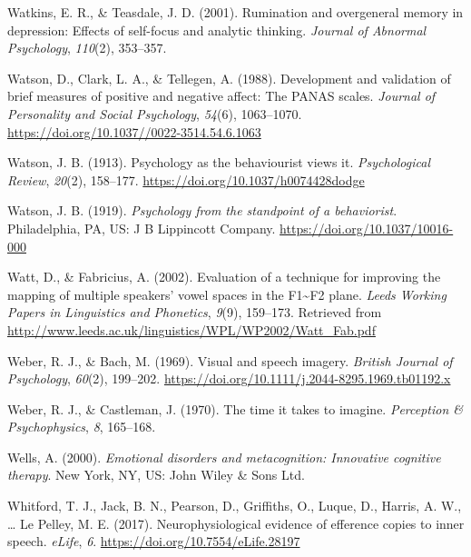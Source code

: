 \documentclass[a4paper,12pt,twoside,onecolumn,openright,final,oldfontcommands]{memoir}
\begin{document}
\leavevmode\hypertarget{ref-watkins_rumination_2001}{}%
Watkins, E. R., \& Teasdale, J. D. (2001). Rumination and overgeneral memory in depression: Effects of self-focus and analytic thinking. \emph{Journal of Abnormal Psychology}, \emph{110}(2), 353--357.

\leavevmode\hypertarget{ref-watson_development_1988}{}%
Watson, D., Clark, L. A., \& Tellegen, A. (1988). Development and validation of brief measures of positive and negative affect: The PANAS scales. \emph{Journal of Personality and Social Psychology}, \emph{54}(6), 1063--1070. \url{https://doi.org/10.1037//0022-3514.54.6.1063}

\leavevmode\hypertarget{ref-watson_psychology_1913}{}%
Watson, J. B. (1913). Psychology as the behaviourist views it. \emph{Psychological Review}, \emph{20}(2), 158--177. \url{https://doi.org/10.1037/h0074428dodge}

\leavevmode\hypertarget{ref-watson_psychology_1919}{}%
Watson, J. B. (1919). \emph{Psychology from the standpoint of a behaviorist}. Philadelphia, PA, US: J B Lippincott Company. \url{https://doi.org/10.1037/10016-000}

\leavevmode\hypertarget{ref-watt_evaluation_2002}{}%
Watt, D., \& Fabricius, A. (2002). Evaluation of a technique for improving the mapping of multiple speakers' vowel spaces in the F1\textasciitilde F2 plane. \emph{Leeds Working Papers in Linguistics and Phonetics}, \emph{9}(9), 159--173. Retrieved from \url{http://www.leeds.ac.uk/linguistics/WPL/WP2002/Watt_Fab.pdf}

\leavevmode\hypertarget{ref-weber_visual_1969}{}%
Weber, R. J., \& Bach, M. (1969). Visual and speech imagery. \emph{British Journal of Psychology}, \emph{60}(2), 199--202. \url{https://doi.org/10.1111/j.2044-8295.1969.tb01192.x}

\leavevmode\hypertarget{ref-weber_time_1970}{}%
Weber, R. J., \& Castleman, J. (1970). The time it takes to imagine. \emph{Perception \& Psychophysics}, \emph{8}, 165--168.

\leavevmode\hypertarget{ref-wells_emotional_2000}{}%
Wells, A. (2000). \emph{Emotional disorders and metacognition: Innovative cognitive therapy}. New York, NY, US: John Wiley \& Sons Ltd.

\leavevmode\hypertarget{ref-whitford_neurophysiological_2017}{}%
Whitford, T. J., Jack, B. N., Pearson, D., Griffiths, O., Luque, D., Harris, A. W., \ldots{} Le Pelley, M. E. (2017). Neurophysiological evidence of efference copies to inner speech. \emph{eLife}, \emph{6}. \url{https://doi.org/10.7554/eLife.28197}
\end{document}
